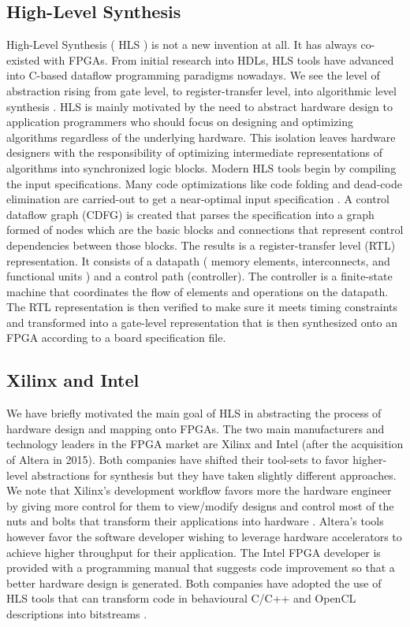 \subsection{High-Level Synthesis}
High-Level Synthesis ( HLS ) is not a new invention at all. It has always co-existed with FPGAs. From initial research into HDLs, HLS tools have advanced into C-based dataflow programming paradigms nowadays. We see the level of abstraction rising from gate level, to register-transfer level, into algorithmic level synthesis \cite{Gupta2008, hlssurv}. HLS is mainly motivated by the need to abstract hardware design to application programmers who should focus on designing and optimizing algorithms regardless of the underlying hardware. This isolation leaves hardware designers with the responsibility of optimizing intermediate representations of algorithms into synchronized logic blocks. 
Modern HLS tools begin by compiling the input specifications. Many code optimizations like code folding and dead-code elimination are carried-out to get a near-optimal input specification \cite{Gupta2008}. A control dataflow graph (CDFG) is created that parses the specification into a graph formed of nodes which are the basic blocks and connections that represent control dependencies between those blocks. The results is a register-transfer level (RTL) representation. It consists of a datapath ( memory elements, interconnects, and functional units ) and a control path (controller). The controller is a finite-state machine that coordinates the flow of elements and operations on the datapath. The RTL representation is then verified to make sure it meets timing constraints and transformed into a gate-level representation that is then synthesized onto an FPGA according to a board specification file. 

\subsection{Xilinx and Intel} \label{adoption}
We have briefly motivated the main goal of HLS in abstracting the process of hardware design and mapping onto FPGAs. The two main manufacturers and technology leaders in the FPGA market are Xilinx and Intel (after the acquisition of Altera in 2015). Both companies have shifted their tool-sets to favor higher-level abstractions for synthesis but they have taken slightly different approaches. We note that Xilinx’s development workflow favors more the hardware engineer by giving more control for them to view/modify designs and control most of the nuts and bolts that transform their applications into hardware \cite{xilinxreference}. Altera’s tools however favor the software developer wishing to leverage hardware accelerators to achieve higher throughput for their application. The Intel FPGA developer is provided with a programming manual that suggests code improvement so that a better hardware design is generated. Both companies have adopted the use of HLS tools that can transform code in behavioural C/C++ and OpenCL descriptions into bitstreams \cite{xilinxreference, intel2016sdk}.

